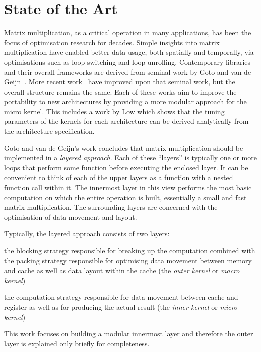 \documentclass[\main/thesis.tex]{subfiles}
\begin{document}
\section{State of the Art}
Matrix multiplication, as a critical operation in many applications, has been the focus of optimisation research for decades.
Simple insights into matrix multiplication have enabled better data usage, both spatially and temporally, via optimisations such as loop switching and loop unrolling.
Contemporary libraries and their overall frameworks are derived from seminal work by Goto and van de Geijn~\autocite{goto2008anatomy}.
More recent work~\autocite{vanzee2015blis,zee2016blis} have improved upon that seminal work, but the overall structure remains the same.
Each of these works aim to improve the portability to new architectures by providing a more modular approach for the micro kernel.
This includes a work by Low \etal which shows that the tuning parameters of the kernels for each architecture can be derived analytically from the architecture specification.

Goto and van de Geijn's work concludes that matrix multiplication should be implemented in a \emph{layered approach}.
Each of these ``layers'' is typically one or more loops that perform some function before executing the enclosed layer.
It can be convenient to think of each of the upper layers as a function with a nested function call within it.
The innermost layer in this view performs the most basic computation on which the entire operation is built, essentially a small and fast matrix multiplication.
The surrounding layers are concerned with the optimisation of data movement and layout.

Typically, the layered approach consists of two layers:
\begin{enumerate*}[itemjoin={{; }}, itemjoin*={{; and }}, label=\textbf{(\arabic*)}, after={.}]
  \item the blocking strategy responsible for breaking up the computation combined with the packing strategy responsible for optimising data movement between memory and cache as well as data layout within the cache (the \emph{outer kernel} or \emph{macro kernel})
  \item the computation strategy responsible for data movement between cache and register as well as for producing the actual result (the \emph{inner kernel} or \emph{micro kernel})
\end{enumerate*}
This work focuses on building a modular innermost layer and therefore the outer layer is explained only briefly for completeness.
\end{document}
